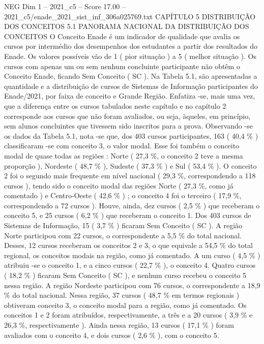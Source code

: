 \begin{textsample}{NEG Dim 1 – 2021\_c5 – Score 17.00 – 2021\_c5/enade\_2021\_sist\_inf\_306a025769.txt}  \label{ex:f1_neg_405}
CAPÍTULO 5 DISTRIBUIÇÃO DOS CONCEITOS 5.1 PANORAMA NACIONAL DA DISTRIBUIÇÃO DOS CONCEITOS O Conceito Enade é um indicador de qualidade que avalia os cursos por intermédio dos desempenhos dos estudantes a partir dos resultados do Enade.
Os valores possíveis vão de 1 ( pior situação ) a 5 ( melhor situação ).
Os cursos com apenas um ou sem nenhum concluinte participante não obtêm o Conceito Enade, ficando Sem Conceito ( SC ).
Na Tabela 5.1, são apresentadas a quantidade e a distribuição de cursos de Sistemas de Informação participantes do Enade/2021, por faixa de conceito e Grande Região.
Enfatiza -se, mais uma vez, que a diferença entre os cursos tabulados neste capítulo e no capítulo 2 corresponde aos cursos que não foram avaliados, ou seja, àqueles, em princípio, sem alunos concluintes que tivessem sido inscritos para a prova.
Observando -se os dados da Tabela 5.1, nota -se que, dos 403 cursos participantes, 163 ( 40,4 \% ) classificaram -se com conceito 3, o valor modal.
Esse foi também o conceito modal de quase todas as regiões : Norte ( 27,3 \%, o conceito 2 teve a mesma proporção ), Nordeste ( 48,7 \% ), Sudeste ( 37,3 \% ) e Sul ( 53,4 \% ).
O conceito 2 foi o segundo mais frequente em nível nacional ( 29,3 \%, correspondendo a 118 cursos ), tendo sido o conceito modal das regiões Norte ( 27,3 \%, como já comentado ) e Centro-Oeste ( 42,6 \% ) ; o conceito 4 foi o terceiro ( 17,9 \%, correspondendo a 72 cursos ).
Houve, ainda, dez cursos ( 2,5 \% ) que receberam o conceito 5, e 25 cursos ( 6,2 \% ) que receberam o conceito 1.
Dos 403 cursos de Sistemas de Informação, 15 ( 3,7 \% ) ficaram Sem Conceito ( SC ).
A região Norte participou com 22 cursos, o correspondente a 5,5 \% do total nacional.
Desses, 12 cursos receberam os conceitos 2 e 3, o que equivale a 54,5 \% do total regional, os conceitos modais na região, como já comentado.
A um curso ( 4,5 \% ) atribuiu -se o conceito 1, e a cinco cursos ( 22,7 \% ), o conceito 4.
Quatro cursos ( 18,2 \% ) ficaram Sem Conceito ( SC ), e nenhum curso recebeu o conceito 5 nessa região.
A região Nordeste participou com 76 cursos, o correspondente a 18,9 \% do total nacional.
Nessa região, 37 cursos ( 48,7 \% em termos regionais ) obtiveram conceito 3, o conceito modal para a região, como já comentado.
Os conceitos 1 e 2 foram atribuídos, respectivamente, a três e a 20 cursos ( 3,9 \% e 26,3 \%, respectivamente ).
Ainda nessa região, 13 cursos ( 17,1 \% ) foram avaliados com o conceito 4, e dois cursos ( 2,6 \% ), com o conceito 5.

\end{textsample}
